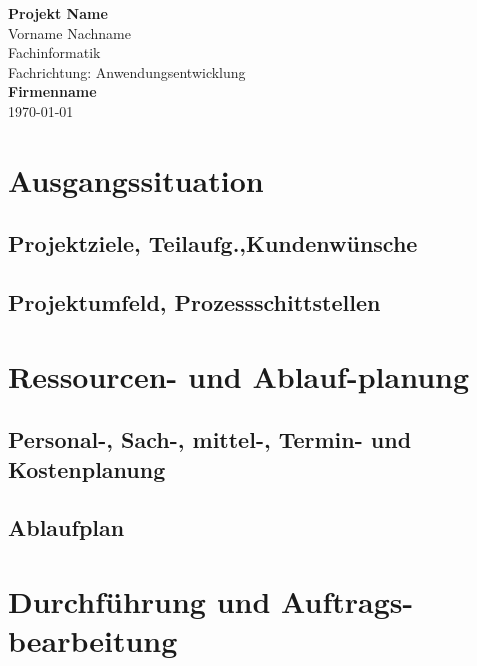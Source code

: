 \documentclass[10pt,a4paper,appendixprefix,liststotoc]{scrreprt}
\begin{document}
\begin{titlepage}
 \begin{center}
	\huge
	\textbf{Projekt Name} %
	\bigskip\\
	\large
	Vorname Nachname \\   %
	Fachinformatik\\
	Fachrichtung: Anwendungsentwicklung %
	\bigskip\\
   \textbf{Firmenname} %
	\bigskip\\
	\today
\end{center}
\end{titlepage}
\newpage
{}
\tableofcontents
\newpage
{}


\chapter{Ausgangssituation}

\section{Projektziele, Teilaufg.,Kundenw\"unsche }

\section{Projektumfeld, Prozessschittstellen}

\chapter{Ressourcen- und Ablauf-planung}

\section{Personal-, Sach-, mittel-, Termin- und Kostenplanung}

\section{Ablaufplan}

\chapter{Durchführung und Auftrags-bearbeitung}
\end{document}
